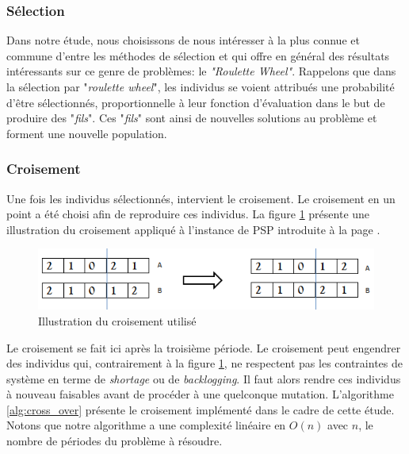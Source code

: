 		\subsubsection{Sélection}
		
		\hspace*{.5cm} Dans notre étude, nous choisissons de nous intéresser à la plus connue et commune d'entre les méthodes de sélection et qui offre en général des résultats intéressants sur ce genre de problèmes: le \emph{"Roulette Wheel"}. Rappelons que dans la sélection par "\emph{roulette wheel}", les individus se voient attribués une probabilité d'être sélectionnés, proportionnelle à leur fonction d'évaluation dans le but de produire des "\emph{fils}". Ces "\emph{fils}" sont ainsi de nouvelles solutions au problème et forment une nouvelle population.		
		
		\subsubsection{Croisement}
		
		Une fois les individus sélectionnés, intervient le croisement. Le croisement en un point a été choisi afin de reproduire ces individus. La figure \ref{fig:used_cross_over} présente une illustration du croisement appliqué à l'instance de PSP introduite à la page \pageref{sec:problem_description}.
		\begin{figure}[!h]
			\begin{center}
				\includegraphics[scale=.5]{images/cross_over_fig.png}
				\caption{Illustration du croisement utilisé}
				\label{fig:used_cross_over}
			\end{center}
		\end{figure}
		
		Le croisement se fait ici après la troisième période. Le croisement peut engendrer des individus qui, contrairement à la figure \ref{fig:used_cross_over}, ne respectent pas les contraintes de système en terme de \emph{shortage} ou de \emph{backlogging}. Il faut alors rendre ces individus à nouveau faisables avant de procéder à une quelconque mutation. L'algorithme \ref{alg:cross_over} présente le croisement implémenté dans le cadre de cette étude. Notons que notre algorithme a une complexité linéaire en $O(n)$ avec $n$, le nombre de périodes du problème à résoudre.\\
		

